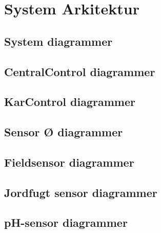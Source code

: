 
\chapter{System Arkitektur}


\section{System diagrammer}


\newpage
\section{CentralControl diagrammer}


\newpage
\section{KarControl diagrammer}


\newpage
\section{Sensor Ø diagrammer}


\newpage
\section{Fieldsensor diagrammer}


\newpage
\section{Jordfugt sensor diagrammer}


\newpage
\section{pH-sensor diagrammer}


